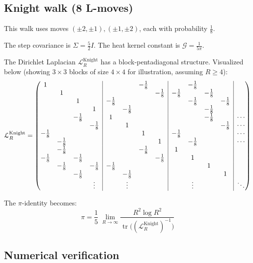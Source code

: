\documentclass{article}
\numberwithin{equation}{section}
\theoremstyle{definition}
\theoremstyle{remark}
\newcommand{\cG}{\mathcal{G}}
\DeclareMathOperator{\tr}{tr}
\begin{document}
\subsection{Knight walk (8 L-moves)}\label{app:knight}

This walk uses moves $(\pm2,\pm1),(\pm1,\pm2)$, each with probability $ \tfrac{1}{8} $.

The step covariance is $\Sigma = \tfrac{5}{2} I$. The heat kernel constant is $\cG = \frac{1}{5\pi}$.

The Dirichlet Laplacian $\mathcal{L}_R^{\text{Knight}}$ has a block-pentadiagonal structure. Visualized below (showing $3\times 3$ blocks of size $4\times 4$ for illustration, assuming $R\ge 4$):
\[
\mathcal{L}_R^{\text{Knight}} =
\left(\begin{array}{@{}cccc|cccc|cccc|c@{}}
1 & & & & & & -\frac{1}{8} & & & -\frac{1}{8} & & & \\
& 1 & & & & & & -\frac{1}{8} & -\frac{1}{8} & & -\frac{1}{8} & & \\
& & 1 & & -\frac{1}{8} & & & & & -\frac{1}{8} & & -\frac{1}{8} & \\
& & & 1 & & -\frac{1}{8} & & & & & -\frac{1}{8} & & \\
\hline
& & -\frac{1}{8} & & 1 & & & & & & -\frac{1}{8} & & \cdots \\
& & & -\frac{1}{8} & & 1 & & & & & & -\frac{1}{8} & \cdots \\
-\frac{1}{8} & & & & & & 1 & & -\frac{1}{8} & & & & \cdots \\
& -\frac{1}{8} & & & & & & 1 & & -\frac{1}{8} & & & \cdots \\
\hline
& -\frac{1}{8} & & & & & -\frac{1}{8} & & 1 & & & & \\
-\frac{1}{8} & & -\frac{1}{8} & & & & & -\frac{1}{8} & & 1 & & & \\
& -\frac{1}{8} & & -\frac{1}{8} & -\frac{1}{8} & & & & & & 1 & & \\
& & -\frac{1}{8} & & & -\frac{1}{8} & & & & & & 1 & \\
\hline
& & & \vdots & & \vdots & & & & \vdots & & & \ddots
\end{array}\right)
\]

The $\pi$-identity becomes:
\begin{equation}\label{eq:Knight_pi}
\boxed{\;\displaystyle \pi=\frac{1}{5}\;\lim_{R\to\infty}\frac{R^{2}\log R^{2}}{\tr\!\bigl((\mathcal{L}_R^{\text{Knight}})^{-1}\bigr)}\;}
\end{equation}


\subsection{Numerical verification}\label{app:numerical}
\end{document}
